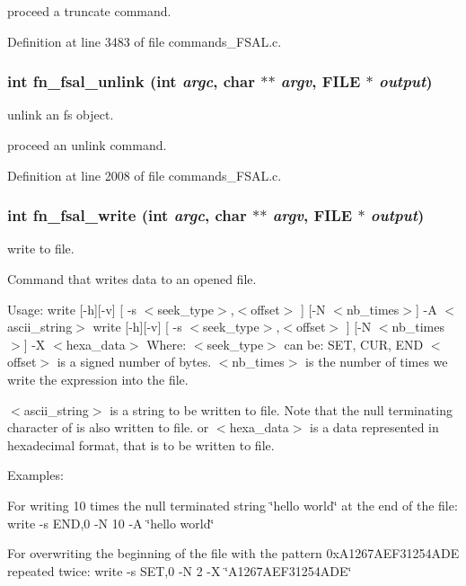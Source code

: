 proceed a truncate command. 

Definition at line 3483 of file commands\_\-FSAL.c.
\subsubsection[{fn\_\-fsal\_\-unlink}]{\setlength{\rightskip}{0pt plus 5cm}int fn\_\-fsal\_\-unlink (int {\em argc}, \/  char $\ast$$\ast$ {\em argv}, \/  FILE $\ast$ {\em output})}\label{commands_8h_a8dbde159a7a808f5fc63ee46bfbb0aa2}
unlink an fs object.

proceed an unlink command. 

Definition at line 2008 of file commands\_\-FSAL.c.
\subsubsection[{fn\_\-fsal\_\-write}]{\setlength{\rightskip}{0pt plus 5cm}int fn\_\-fsal\_\-write (int {\em argc}, \/  char $\ast$$\ast$ {\em argv}, \/  FILE $\ast$ {\em output})}\label{commands_8h_a4874930678cbb1e7a19e0bab498f5a4c}
write to file.

Command that writes data to an opened file.

Usage: write [-\/h][-\/v] [ -\/s $<$seek\_\-type$>$,$<$offset$>$ ] [-\/N $<$nb\_\-times$>$] -\/A $<$ascii\_\-string$>$ write [-\/h][-\/v] [ -\/s $<$seek\_\-type$>$,$<$offset$>$ ] [-\/N $<$nb\_\-times$>$] -\/X $<$hexa\_\-data$>$ Where: $<$seek\_\-type$>$ can be: SET, CUR, END $<$offset$>$ is a signed number of bytes. $<$nb\_\-times$>$ is the number of times we write the expression into the file.

$<$ascii\_\-string$>$ is a string to be written to file. Note that the null terminating character of is also written to file. or $<$hexa\_\-data$>$ is a data represented in hexadecimal format, that is to be written to file.

Examples:

For writing 10 times the null terminated string \char`\"{}hello world\char`\"{} at the end of the file: write -\/s END,0 -\/N 10 -\/A \char`\"{}hello world\char`\"{}

For overwriting the beginning of the file with the pattern 0xA1267AEF31254ADE repeated twice: write -\/s SET,0 -\/N 2 -\/X \char`\"{}A1267AEF31254ADE\char`\"{} 

